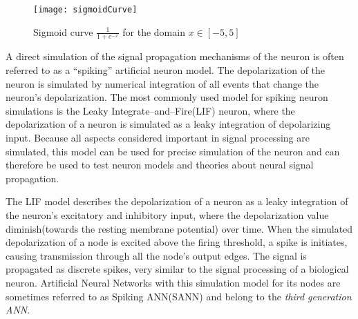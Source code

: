 \begin{figure}[hbt!p]
	\centering
	\texttt{[image: sigmoidCurve]}
	\caption{Sigmoid curve $\frac{1}{1+e^{-x}}$ for the domain $x\in [-5,5]$}
	\label{figSigmoidCurve}
\end{figure}
	
	A direct simulation of the signal propagation mechanisms of the neuron is often referred to as a ``spiking'' artificial neuron model. %
	The depolarization of the neuron is simulated by numerical integration of all events that change the neuron's depolarization.
	The most commonly used model for spiking neuron simulations is the Leaky Integrate--and--Fire(LIF) neuron, where the depolarization of a neuron is simulated as a leaky integration of depolarizing input\cite{florian03}.
	Because all aspects considered important in signal processing are simulated, this model can be used for precise simulation of the neuron and can therefore be used to test neuron models and theories about neural signal propagation.

	The LIF model describes the depolarization of a neuron as a leaky integration of the neuron's excitatory and inhibitory input, where the depolarization value diminish(towards the resting membrane potential) over time.
	When the simulated depolarization of a node is excited above the firing threshold, a spike is initiates, causing transmission through all the node's output edges. %
	The signal is propagated as discrete spikes, very similar to the signal processing of a biological neuron\cite{Kunkle02pulsedneural}.
	Artificial Neural Networks with this simulation model for its nodes are sometimes referred to as Spiking ANN(SANN) and belong to the \emph{third generation ANN}\cite{Maass97networksof}. %
	

